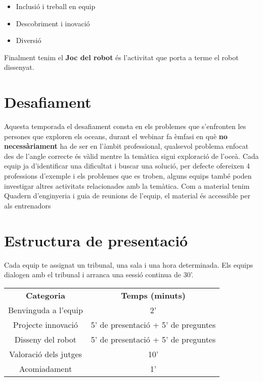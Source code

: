\documentclass{article}
\begin{document}
\begin{itemize}
    \item Inclusió i treball en equip
    \item Descobriment i inovació
    \item Diversió
\end{itemize}

Finalment tenim el \textbf{Joc del robot} és l'activitat que porta a terme el robot dissenyat.


\section{Desafiament}

Aquesta temporada el desafiament consta en els problemes que s'enfronten les persones que exploren els oceans, durant el webinar fa èmfasi en què \textbf{no necessàriament} ha de ser en l'àmbit professional, qualsevol problema enfocat des de l'angle correcte és vàlid mentre la temàtica sigui exploració de l'oceà.
\hfill \break\hfill \break
Cada equip ja d’identificar una dificultat i buscar una solució, per defecte ofereixen 4 professions d’exemple i els problemes que es troben, alguns equips també poden investigar altres activitats relacionades amb la temàtica. Com a material tenim Quadern d'enginyeria i guia de reunions de l'equip, el material és accessible per als entrenadors 


\section{Estructura de presentació}

Cada equip te assignat un tribunal, una sala i una hora determinada. Els equips dialogen amb el tribunal i arranca una sessió continua de 30’.

\hfill \break\hfill \break
\begin{tabular}{ |c|c| } 

 \hline

 \textbf{Categoria} & \textbf{Temps (minuts)} \\ 

 Benvinguda a l'equip  & 2'  \\ 

 Projecte innovació & 5' de presentació + 5' de preguntes   \\ 

 Disseny del robot & 5' de presentació + 5' de preguntes  \\ 

 Valoració dels jutges & 10'  \\ 

 Acomiadament & 1'   \\ 

 \hline

\end{tabular}
\end{document}
